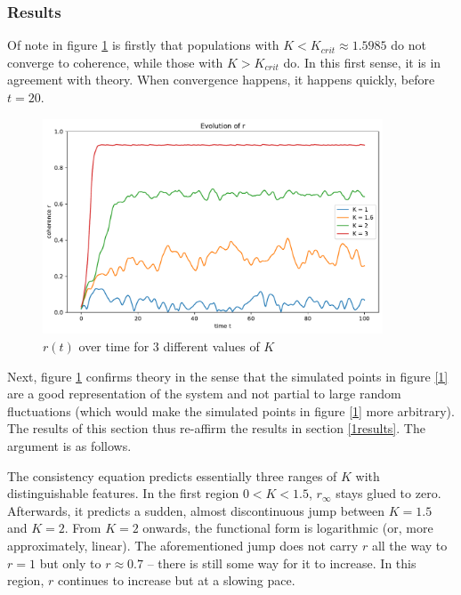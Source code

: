 \documentclass[11pt,a4paper]{article}
\newcommand{\graph}{\medskip\noindent}
\begin{document}
\subsubsection{Results}

Of note in figure \ref{2} is firstly that populations with $K<K_{crit} \approx 1.5985$ do not converge to coherence, while those with $K>K_{crit}$ do. 
In this first sense, it is in agreement with theory. 
When convergence happens, it happens quickly, before $t = 20$.

\begin{figure}[h]
	\centering
	\includegraphics[width=0.9\textwidth]{graphics/2_t-vs-r_omegaDistr=normal_N=1000_1611744007.pdf}
	\caption{$r(t)$ over time for 3 different values of $K$}
	\label{2}
\end{figure}


\graph
Next, figure \ref{2} confirms theory in the sense that the simulated points in figure \ref{1} are a good representation of the system and not partial to large random fluctuations (which would make the simulated points in figure \ref{1} more arbitrary).
The results of this section thus re-affirm the results in section \ref{1results}. 
The argument is as follows.

The consistency equation predicts essentially three ranges of $K$ with distinguishable features.
In the first region $0<K<1.5$, $r_\infty$ stays glued to zero. 
Afterwards, it predicts a sudden, almost discontinuous jump between $K=1.5$ and $K=2$. 
From $K=2$ onwards, the functional form is logarithmic (or, more approximately, linear).
The aforementioned jump does not carry $r$ all the way to $r=1$ but only to $r\approx 0.7$ -- there is still some way for it to increase. 
In this region, $r$ continues to increase but at a slowing pace. 
\end{document}
